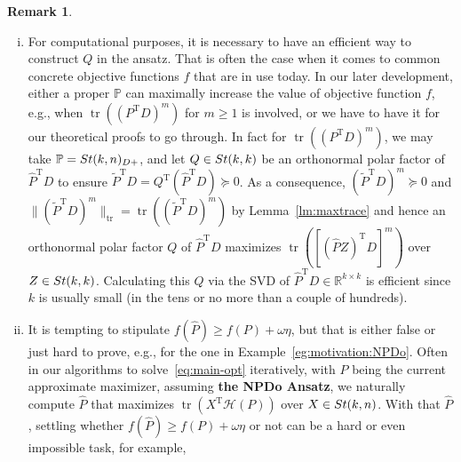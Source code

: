 \documentclass[11pt]{article}
\def\bbP{\mathbb{P}}
\def\bbR{\mathbb{R}}
\def\scrH{\mathscr{H}}
\def\wtd{\widetilde}
\def\what{\widehat}
\newcommand\STM[2]{{\rm St}(#1,#2)}
\DeclareMathOperator{\tr}{tr}
\DeclareMathOperator{\T}{T}
\theoremstyle{definition}
\newtheorem{remark}{Remark}[section]
\numberwithin{equation}{section}
\begin{document}
\begin{remark}
\begin{enumerate}[(i)]
  \item For computational purposes, it is necessary to have an efficient way
        to construct $Q$ in the ansatz. That is often the case when
        it comes to common concrete objective functions $f$ that are in use today.
        In our later development, either
        a proper $\bbP$ can maximally increase the value of objective function $f$, e.g.,
        when $\tr((P^{\T}D)^m)$  for $m\ge 1$ is involved, or
        we have to have it for our theoretical proofs to go through. In fact for $\tr((P^{\T}D)^m)$,
        we may take $\bbP=\STM{k}{n}_{D+}$,
        and let $Q\in\STM{k}{k}$ be an orthonormal polar factor of
        $\what P^{\T}D$ to ensure
        $\wtd P^{\T}D=Q^{\T}(\what P^{\T}D)\succeq 0$.
        As a consequence, $(\wtd P^{\T}D)^m\succeq 0$ and $\|(\wtd P^{\T}D)^m\|_{\tr}=\tr((\wtd P^{\T}D)^m)$
        by Lemma~\ref{lm:maxtrace} and hence
        an orthonormal polar factor $Q$ of
        $\what P^{\T}D$ maximizes $\tr([(\what PZ)^{\T}D]^m)$ over $Z\in\STM{k}{k}$.
        Calculating this $Q$ via the SVD of $\what P^{\T}D\in\bbR^{k\times k}$ is efficient since $k$ is usually small
        (in the tens or no more than a couple of hundreds).
%
  \item It is tempting to stipulate  $f(\what P)\ge f(P)+\omega\eta$, but that is either false or just hard to prove, e.g.,
        for  the one in Example~\ref{eg:motivation:NPDo}. Often in our algorithms to solve~\eqref{eq:main-opt} iteratively, with $P$ being
        the current approximate maximizer, assuming {\bf the NPDo Ansatz}, we naturally
        compute $\what P$ that maximizes $\tr(X^{\T}\scrH(P))$ over $X\in\STM{k}{n}$. With that $\what P$, settling
        whether $f(\what P)\ge f(P)+\omega\eta$ or not can be a hard or even impossible task, for example,

\end{enumerate}
\end{remark}
\end{document}
